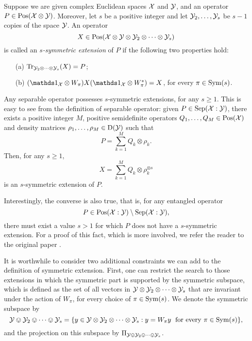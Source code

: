 \begin{definition}
  Suppose we are given complex Euclidean spaces $\mathcal{X}$ and $\mathcal{Y}$, and an operator
  $P\in\mathrm{Pos}(\mathcal{X}\otimes\mathcal{Y})$. Moreover, let $s$ be a positive integer and let 
  $\mathcal{Y}_{2},\ldots,\mathcal{Y}_{s}$ be $s-1$ copies of the space $\mathcal{Y}$. An operator 
  \begin{equation}
    X \in \mathrm{Pos}(\mathcal{X}\otimes\mathcal{Y}\otimes\mathcal{Y}_{2}\otimes\cdots\otimes\mathcal{Y}_{s})
  \end{equation}
  is called an \emph{$s$-symmetric extension} of $P$ if the following two 
  properties hold:
  \begin{itemize}
    \item[(a)] $\operatorname{Tr}_{\mathcal{Y}_{2}\otimes\cdots\otimes\mathcal{Y}_{s}}(X) = P$;
    \item[(b)] $(\I_{\X}\otimes W_{\pi})X(\I_{\X}\otimes W_{\pi}^{\ast}) = X$,
      for every $\pi\in\mathrm{Sym}(s)$.
  \end{itemize}
\end{definition}

Any separable operator possesses $s$-symmetric extensions, for any $s \geq 1$. 
This is easy to see from the definition of separable operator: given 
$P\in\mathrm{Sep}(\mathcal{X}:\mathcal{Y})$, there exists a positive integer $M$, positive semidefinite 
operators $Q_1,\ldots,Q_M \in \mathrm{Pos}(\mathcal{X})$ and density matrices $\rho_1,\ldots, \rho_M\in\mathrm{D}(\mathcal{Y})$ 
such that
\begin{equation}
  P = \sum_{k = 1}^M Q_{k} \otimes \rho_{k}.
\end{equation} 
Then, for any $s \geq 1$,
\begin{equation}
\label{eq:X-extension}
  X = \sum_{k = 1}^M Q_k \otimes \rho_{k}^{\otimes s}
\end{equation}
is an $s$-symmetric extension of $P$.

Interestingly, the converse is also true, that is, for any entangled operator 
\begin{equation}
P \in \mathrm{Pos}(\mathcal{X}:\mathcal{Y}) \setminus \mathrm{Sep}(\mathcal{X}:\mathcal{Y}),
\end{equation}
there must exist a value $s > 1$ for which $P$ does not have a $s$-symmetric 
extension. For a proof of this fact, which is more involved, we refer the 
reader to the original paper \cite{Doherty02}.

It is worthwhile to consider two additional constraints we can add to the 
definition of symmetric extension. 
First, one can restrict the search to those extensions in which the symmetric part
is supported by the symmetric subspace, 
which is defined as the set of all vectors in $\mathcal{Y}\otimes\mathcal{Y}_{2}\otimes\cdots\otimes\mathcal{Y}_{s}$
that are invariant under the action of $W_{\pi}$, for every choice of $\pi\in\mathrm{Sym}(s)$.
We denote the symmetric subspace by
\begin{equation}
  \mathcal{Y}\ovee\mathcal{Y}_{2}\ovee\cdots\ovee\mathcal{Y}_{s} = \{ y \in \mathcal{Y}\otimes\mathcal{Y}_{2}\otimes\cdots\otimes\mathcal{Y}_{s}
    : y = W_{\pi}y \;\mbox{ for every $\pi\in\mathrm{Sym}(s)$} \},
\end{equation}
and the projection on this subspace by $\Pi_{\mathcal{Y}\ovee\mathcal{Y}_{2}\ovee\cdots\ovee\mathcal{Y}_{s}}$.


